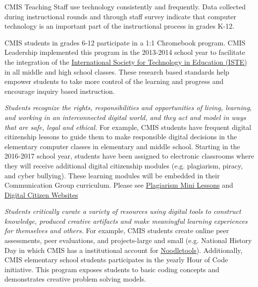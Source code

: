 \begin{findings}
CMIS Teaching Staff use technology consistently and frequently. Data collected during instructional rounds and through staff survey indicate that computer technology is an important part of the instructional process in grades K-12. 


CMIS students in grades 6-12 participate in a 1:1 Chromebook program. CMIS Leadership implemented this program in the 2013-2014 school year to facilitate the integration of the \href{https://drive.google.com/a/cmis.ac.th/file/d/0ByVFfrm0zfolakw5TUstQ1ZrVDFCRjR1d1JQSUpQbkZaVDBr/view?usp=sharing}{International Society for Technology in Education (ISTE)} in all middle and high school classes. These research based standards help empower students to take more control of the learning and progress and encourage inquiry based instruction. 

\textit{Students recognize the rights, responsibilities and opportunities of living, learning, and working in an interconnected digital world, and they act and model in ways that are safe, legal and ethical.} For example, CMIS students have frequent digital citizenship lessons to guide them to make responsible digital decisions in the elementary computer classes in elementary and middle school. Starting in the 2016-2017 school year, students have been assigned to electronic classrooms where they will receive additional digital citizenship modules (e.g. plagiarism, piracy, and cyber bullying). These learning modules will be embedded in their Communication Group curriculum. Please see \href{https://docs.google.com/a/cmis.ac.th/document/d/1TRVPFDs7fyAcRDXcuaha4E4jx53zryfG155vC8Sd-sk/edit?usp=sharing}{Plagiarism Mini Lessons} and \href{https://docs.google.com/a/cmis.ac.th/document/d/1xBZgw3vpW2UPOx_kEWC0oCk34H1OWDri1o4hcQS5VQc/edit?usp=sharing}{Digital Citizen Websites} 

\textit{Students critically curate a variety of resources using digital tools
to construct knowledge, produced creative artifacts and make
meaningful learning experiences for themselves and others.} For example, CMIS students create online peer assessments, peer evaluations, and projects-large and small (e.g. National History Day in which CMIS has a institutional account for \href{http://www.noodletools.com/}{Noodletools}). Additionally, CMIS elementary school students participates in the yearly Hour of Code initiative. This program exposes students to basic coding concepts and demonstrates creative problem solving models. 


\end{findings}
